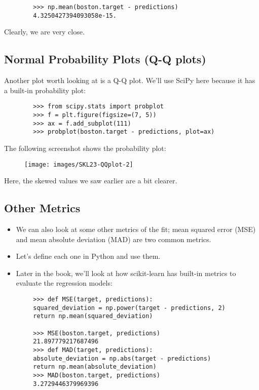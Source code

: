 \documentclass[SKL-MASTER.tex]{subfiles}
\begin{document}
	
	\begin{framed}
		\begin{verbatim}
		>>> np.mean(boston.target - predictions)
		4.3250427394093058e-15.
		\end{verbatim}
	\end{framed}
	Clearly, we are very close.
	\subsection*{Normal Probability Plots (Q-Q plots)}
	Another plot worth looking at is a Q-Q plot. We'll use SciPy here because it has a built-in
	probability plot:
	\begin{framed}
		\begin{verbatim}
		>>> from scipy.stats import probplot
		>>> f = plt.figure(figsize=(7, 5))
		>>> ax = f.add_subplot(111)
		>>> probplot(boston.target - predictions, plot=ax)
		\end{verbatim}
	\end{framed}
	The following screenshot shows the probability plot:
	
	
	\begin{figure}
\centering
\texttt{[image: images/SKL23-QQplot-2]}
\end{figure}

	Here, the skewed values we saw earlier are a bit clearer.
	\subsection*{Other Metrics}
	\begin{itemize}
\item 	We can also look at some other metrics of the fit; mean squared error (MSE) and mean
	absolute deviation (MAD) are two common metrics.
\item Let's define each one in Python and
	use them. 
\item Later in the book, we'll look at how scikit-learn has built-in metrics to evaluate the regression models:
	\end{itemize}

	\begin{framed}
		\begin{verbatim}
		>>> def MSE(target, predictions):
		squared_deviation = np.power(target - predictions, 2)
		return np.mean(squared_deviation)
		
		>>> MSE(boston.target, predictions)
		21.897779217687496
		>>> def MAD(target, predictions):
		absolute_deviation = np.abs(target - predictions)
		return np.mean(absolute_deviation)
		>>> MAD(boston.target, predictions)
		3.2729446379969396
		\end{verbatim}
	\end{framed}
\end{document}
